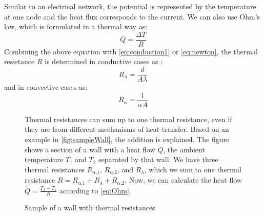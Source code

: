     Similar to an electrical network, the potential is represented by the temperature at one node and the heat flux corresponds to the current. We can also use Ohm's law, which is formulated in a thermal way as:  
     \begin{equation}
    \label{eq:Ohm}
        \dot{Q} = \frac{\Delta T}{R} 
    \end{equation}
    Combining the above equation with \autoref{eq:conduction1} or \autoref{eq:newton}, the thermal resistance $R$ is determined in conductive cases as \cite{Kuchling.2007}:
    \begin{equation}
    \label{eq:r_lambda}
        R_\lambda = \frac{d}{A\lambda}
    \end{equation}
   and in convective cases as\cite{Griesinger.2019}:
    \begin{equation}
        R_\alpha = \frac{1}{\alpha A}
    \end{equation}
    
    \begin{figure}[h]
    \begin{minipage}[t]{7cm}
    \vspace{0pt}
    Thermal resistances can sum up to one thermal resistance, even if they are from different mechanisms of heat transfer. Based on an example in \autoref{fig:sampleWall}, the addition is explained. The figure shows a section of a wall with a heat flow $\dot{Q}$, the ambient temperature $T_\text{1}$ and $T_\text{2}$ separated by that wall. We have three thermal resistances $R_{\alpha\text{,1}}$, $R_{\alpha\text{,2}}$, and $R_\lambda$, which we sum to one thermal resistance $R = R_{\alpha\text{,1}} + R_\lambda + R_{\alpha\text{,2}}$. Now, we can calculate the heat flow $\dot{Q}= \frac{T_\text{2}-T_\text{1}}{R} $ according to \autoref{eq:Ohm}.
    \end{minipage}
    \hfill
    \begin{minipage}[t]{7cm}
    \vspace{0pt}
    \centering
    
    \caption{Sample of a wall with thermal resistances}
    \label{fig:sampleWall}
    \end{minipage}
    \end{figure}
    
